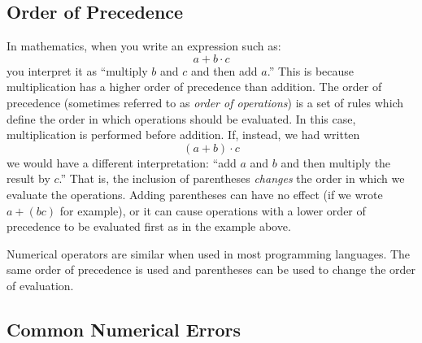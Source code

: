\subsection{Order of Precedence}
\label{subsection:NumericalOperators_OrderOfPrecedence}

In mathematics, when you write an expression such as:
  $$a + b \cdot c$$
you interpret it as ``multiply $b$ and $c$ and then add $a$.''  This is because 
multiplication has a higher \gls{order of precedence} than addition.  The order
of precedence (sometimes referred to as \emph{order of operations}) is a set
of rules which define the order in which operations should be evaluated.  In this
case, multiplication is performed before addition.  If, instead, we had written 
  $$(a + b) \cdot c$$
we would have a different interpretation: ``add $a$ and $b$ and then multiply 
the result by $c$.''  That is, the inclusion of parentheses \emph{changes} the order
in which we evaluate the operations.  Adding parentheses can have no effect
(if we wrote $a + (bc)$ for example), or it can cause operations with a lower
order of precedence to be evaluated first as in the example above.

Numerical operators are similar when used in most programming languages.
The same order of precedence is used and parentheses can be used to change
the order of evaluation.

\subsection{Common Numerical Errors}
\label{subsection:commonNumericalErrors}

